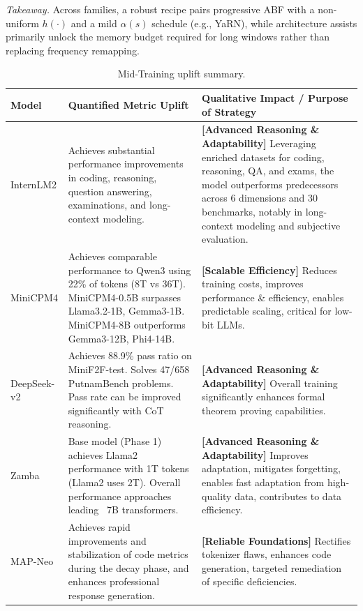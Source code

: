 \noindent\textit{Takeaway.} Across families, a robust recipe pairs progressive ABF with a non-uniform \(h(\cdot)\) and a mild \(\alpha(s)\) schedule (e.g., YaRN), while architecture assists primarily unlock the memory budget required for long windows rather than replacing frequency remapping.


\begin{table}[h]
  \centering
  \caption{Mid-Training uplift summary.}
  \label{tab:annealing uplift summary}
  \begin{tabular}{p{1.5cm}p{7.6cm}p{7.6cm}}
    \toprule
    \textbf{Model} & \textbf{Quantified Metric Uplift} & \textbf{Qualitative Impact / Purpose of Strategy} \\
    \midrule
    InternLM2     & Achieves substantial performance improvements in coding, reasoning, question answering, examinations, and long-context modeling. & \textbf{[Advanced Reasoning \& Adaptability]} Leveraging enriched datasets for coding, reasoning, QA, and exams, the model outperforms predecessors across 6 dimensions and 30 benchmarks, notably in long-context modeling and subjective evaluation. \\
    \midrule
    MiniCPM4      & Achieves comparable performance to Qwen3 using 22\% of tokens (8T vs 36T). MiniCPM4-0.5B surpasses Llama3.2-1B, Gemma3-1B. MiniCPM4-8B outperforms Gemma3-12B, Phi4-14B. & \textbf{[Scalable Efficiency]} Reduces training costs, improves performance \& efficiency, enables predictable scaling, critical for low-bit LLMs. \\
    \midrule
    DeepSeek-v2   & Achieves 88.9\% pass ratio on MiniF2F-test. Solves 47/658 PutnamBench problems. Pass rate can be improved significantly with CoT reasoning. & \textbf{[Advanced Reasoning \& Adaptability]} Overall training significantly enhances formal theorem proving capabilities. \\
    \midrule
    Zamba         & Base model (Phase 1) achieves Llama2 performance with 1T tokens (Llama2 uses 2T). Overall performance approaches leading ~7B transformers. & \textbf{[Advanced Reasoning \& Adaptability]} Improves adaptation, mitigates forgetting, enables fast adaptation from high-quality data, contributes to data efficiency. \\
    \midrule
    MAP-Neo       & Achieves rapid improvements and stabilization of code metrics during the decay phase, and enhances professional response generation. & \textbf{[Reliable Foundations]} Rectifies tokenizer flaws, enhances code generation, targeted remediation of specific deficiencies. \\

\end{tabular}
\end{table}
